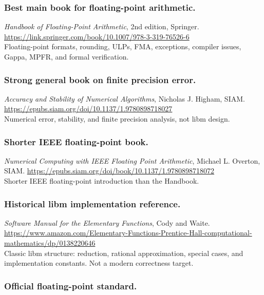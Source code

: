 \documentclass[manuscript, nonacm]{acmart}
\begin{document}
  \subsubsection{Best main book for floating-point arithmetic.}

  \emph{Handbook of Floating-Point Arithmetic}, 2nd edition, Springer.
  \url{https://link.springer.com/book/10.1007/978-3-319-76526-6}\\
  Floating-point formats, rounding, ULPs, FMA, exceptions, compiler issues,
  Gappa, MPFR, and formal verification.

  \subsubsection{Strong general book on finite precision error.}

  \emph{Accuracy and Stability of Numerical Algorithms}, Nicholas J. Higham,
  SIAM.
  \url{https://epubs.siam.org/doi/10.1137/1.9780898718027}\\
  Numerical error, stability, and finite precision analysis, not libm design.

  \subsubsection{Shorter IEEE floating-point book.}

  \emph{Numerical Computing with IEEE Floating Point Arithmetic}, Michael L.
  Overton, SIAM.
  \url{https://epubs.siam.org/doi/book/10.1137/1.9780898718072}\\
  Shorter IEEE floating-point introduction than the Handbook.

  \subsubsection{Historical libm implementation reference.}

  \emph{Software Manual for the Elementary Functions}, Cody and Waite.
  \url{https://www.amazon.com/Elementary-Functions-Prentice-Hall-computational-mathematics/dp/0138220646}\\
  Classic libm structure: reduction, rational approximation, special cases, and
  implementation constants. Not a modern correctness target.

  \subsubsection{Official floating-point standard.}
\end{document}
